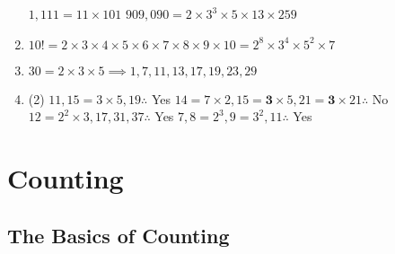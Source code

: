\documentclass[12pt, A4]{article}
\begin{document}
\begin{enumerate}
\begin{tasks}
							\task
								\(1,111 = 11 \times 101\)
							\task
								\(909,090 = 2 \times 3^3 \times 5 \times 13 \times 259\)
						\end{tasks}
					\setcounter{enumi}{4}
					\item
						\(10! = 2 \times 3 \times 4 \times 5 \times 6 \times 7 \times 8 \times 9 \times 10 = 2^8 \times 3^4 \times 5^2 \times 7\)
					\setcounter{enumi}{14}
					\item
						\(30 = 2 \times 3 \times 5 \implies 1, 7, 11, 13, 17, 19, 23, 29\)
					\setcounter{enumi}{16}
					\item
						\begin{tasks}(2)
							\task
								\(11, 15 = 3 \times 5, 19 \therefore\) Yes
							\task
								\(14 = 7 \times 2, 15 = \bm{3} \times 5, 21 = \bm{3} \times 21 \therefore\) No
							\task
								\(12 = 2^2 \times 3, 17, 31, 37 \therefore\) Yes
							\task
								\(7, 8 = 2^3, 9 = 3^2, 11 \therefore\) Yes
						\end{tasks}
				\end{enumerate}
	\setcounter{section}{5}
	\section{Counting}
		\subsection{The Basics of Counting}
\end{document}

